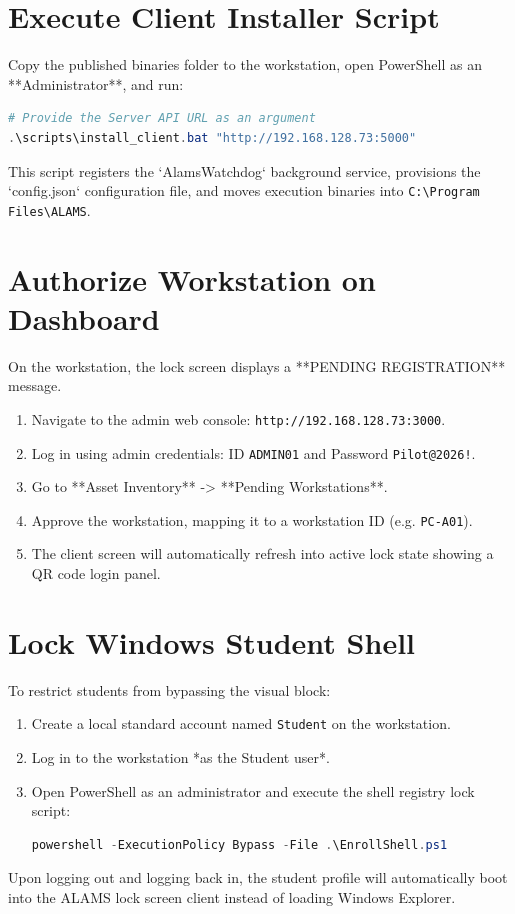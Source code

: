 \documentclass[12pt, a4paper]{report}
\begin{document}
\begin{tcolorbox}[codebox, title={web/.env.local}]
\section{Execute Client Installer Script}
Copy the published binaries folder to the workstation, open PowerShell as an **Administrator**, and run:
\begin{tcolorbox}[codebox, title={Install Client script}]
\begin{lstlisting}[language=PowerShell]
# Provide the Server API URL as an argument
.\scripts\install_client.bat "http://192.168.128.73:5000"
\end{lstlisting}
\end{tcolorbox}
This script registers the `AlamsWatchdog` background service, provisions the `config.json` configuration file, and moves execution binaries into \texttt{C:\textbackslash Program Files\textbackslash ALAMS}.

\section{Authorize Workstation on Dashboard}
On the workstation, the lock screen displays a **PENDING REGISTRATION** message.
\begin{enumerate}
  \item Navigate to the admin web console: \texttt{http://192.168.128.73:3000}.
  \item Log in using admin credentials: ID \texttt{ADMIN01} and Password \texttt{Pilot@2026!}.
  \item Go to **Asset Inventory** -> **Pending Workstations**.
  \item Approve the workstation, mapping it to a workstation ID (e.g. \texttt{PC-A01}).
  \item The client screen will automatically refresh into active lock state showing a QR code login panel.
\end{enumerate}

\section{Lock Windows Student Shell}
To restrict students from bypassing the visual block:
\begin{enumerate}
  \item Create a local standard account named \texttt{Student} on the workstation.
  \item Log in to the workstation *as the Student user*.
  \item Open PowerShell as an administrator and execute the shell registry lock script:
  \begin{lstlisting}[language=PowerShell]
  powershell -ExecutionPolicy Bypass -File .\EnrollShell.ps1
  \end{lstlisting}
\end{enumerate}
Upon logging out and logging back in, the student profile will automatically boot into the ALAMS lock screen client instead of loading Windows Explorer.


\end{tcolorbox}
\end{document}
